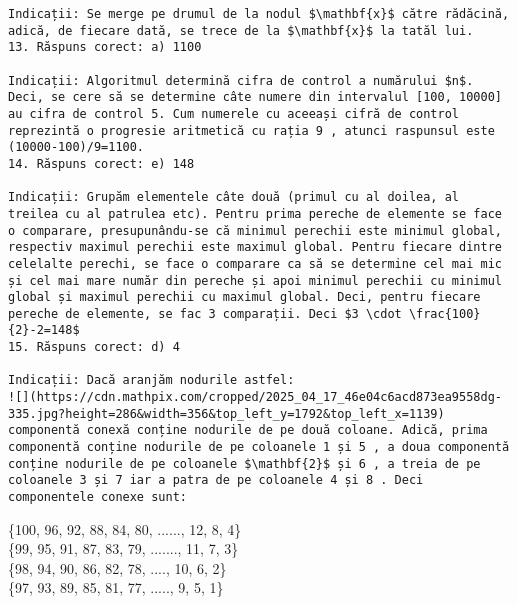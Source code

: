 \begin{verbatim}
Indicații: Se merge pe drumul de la nodul $\mathbf{x}$ către rădăcină, adică, de fiecare dată, se trece de la $\mathbf{x}$ la tatăl lui.
13. Răspuns corect: a) 1100

Indicații: Algoritmul determină cifra de control a numărului $n$. Deci, se cere să se determine câte numere din intervalul [100, 10000] au cifra de control 5. Cum numerele cu aceeași cifră de control reprezintă o progresie aritmetică cu rația 9 , atunci raspunsul este (10000-100)/9=1100.
14. Răspuns corect: e) 148

Indicații: Grupăm elementele câte două (primul cu al doilea, al treilea cu al patrulea etc). Pentru prima pereche de elemente se face o comparare, presupunându-se că minimul perechii este minimul global, respectiv maximul perechii este maximul global. Pentru fiecare dintre celelalte perechi, se face o comparare ca să se determine cel mai mic și cel mai mare număr din pereche și apoi minimul perechii cu minimul global și maximul perechii cu maximul global. Deci, pentru fiecare pereche de elemente, se fac 3 comparații. Deci $3 \cdot \frac{100}{2}-2=148$
15. Răspuns corect: d) 4

Indicații: Dacă aranjăm nodurile astfel:
![](https://cdn.mathpix.com/cropped/2025_04_17_46e04c6acd873ea9558dg-335.jpg?height=286&width=356&top_left_y=1792&top_left_x=1139) componentă conexă conține nodurile de pe două coloane. Adică, prima componentă conține nodurile de pe coloanele 1 și 5 , a doua componentă conține nodurile de pe coloanele $\mathbf{2}$ și 6 , a treia de pe coloanele 3 și 7 iar a patra de pe coloanele 4 și 8 . Deci componentele conexe sunt:
\end{verbatim}

\{100, 96, 92, 88, 84, 80, ......, 12, 8, 4\}\\
\{99, 95, 91, 87, 83, 79, ......., 11, 7, 3\}\\
\{98, 94, 90, 86, 82, 78, ...., 10, 6, 2\}\\
\{97, 93, 89, 85, 81, 77, ....., 9, 5, 1\}

\begin{verbatim}

\end{verbatim}


